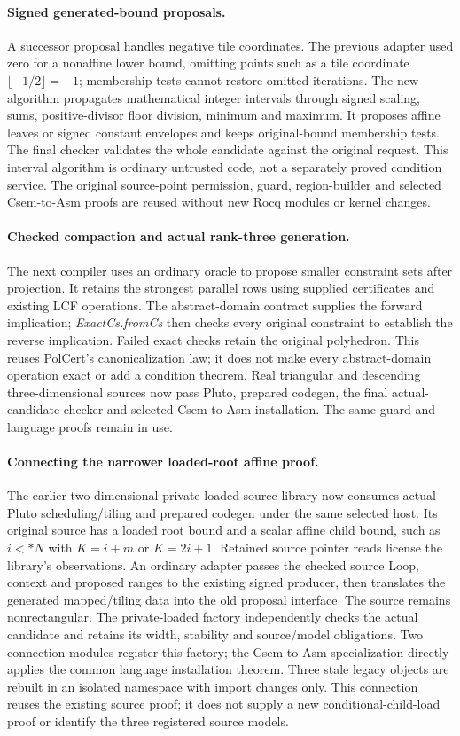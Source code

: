 \paragraph{Signed generated-bound proposals.}
A successor proposal handles negative tile coordinates. The previous adapter
used zero for a nonaffine lower bound, omitting points such as a tile coordinate
$\lfloor -1/2\rfloor=-1$; membership tests cannot restore omitted iterations.
The new algorithm propagates mathematical integer intervals through signed
scaling, sums, positive-divisor floor division, minimum and maximum. It proposes
affine leaves or signed constant envelopes and keeps original-bound membership
tests. The final checker validates the whole candidate against the original
request. This interval algorithm is ordinary untrusted code, not a separately
proved condition service. The original source-point permission, guard,
region-builder and selected Csem-to-Asm proofs are reused without new Rocq
modules or kernel changes.

\paragraph{Checked compaction and actual rank-three generation.}
The next compiler uses an ordinary oracle to propose smaller constraint sets
after projection. It retains the strongest parallel rows using supplied
certificates and existing LCF operations. The abstract-domain contract supplies
the forward implication; \emph{ExactCs.fromCs} then checks every original
constraint to establish the reverse implication. Failed exact checks retain
the original polyhedron. This reuses PolCert's canonicalization law; it does
not make every abstract-domain operation exact or add a condition theorem.
Real triangular and descending three-dimensional sources now pass Pluto,
prepared codegen, the final actual-candidate checker and selected Csem-to-Asm
installation. The same guard and language proofs remain in use.

\paragraph{Connecting the narrower loaded-root affine proof.}
The earlier two-dimensional private-loaded source library now consumes actual
Pluto scheduling/tiling and prepared codegen under the same selected host.
Its original source has a loaded root bound and a scalar affine child bound,
such as $i<*N$ with $K=i+m$ or $K=2i+1$. Retained source pointer reads license
the library's observations. An ordinary adapter passes the checked source Loop,
context and proposed ranges to the existing signed producer, then translates
the generated mapped/tiling data into the old proposal interface. The source
remains nonrectangular. The private-loaded factory independently checks the
actual candidate and retains its width, stability and source/model obligations.
Two connection modules register this factory; the Csem-to-Asm specialization
directly applies the common language installation theorem. Three stale legacy
objects are rebuilt in an isolated namespace with import changes only.
This connection reuses the existing source proof; it does not supply a new
conditional-child-load proof or identify the three registered source models.


